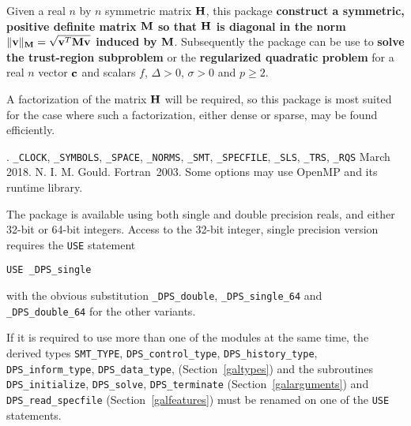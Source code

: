 \documentclass{galahad}
\newcommand{\packagename}{DPS}
\newcommand{\fullpackagename}{\libraryname\_\packagename}
\begin{document}
\galheader


\galsummary
Given a real $n$ by $n$ symmetric matrix ${\mathbf{H}}$, this package {\bf construct a
symmetric, positive definite matrix ${\mathbf{M}}$ so that ${\mathbf{H}}$
is diagonal in the norm $\|{\mathbf{v}}\|_{{\mathbf{M}}} = \sqrt{{\mathbf{v}}^T {\mathbf{M}} {\mathbf{v}}}$
induced by ${\mathbf{M}}$}. Subsequently the package can be use to
{\bf solve the trust-region subproblem}
or the {\bf regularized quadratic problem}
for a real $n$ vector ${\mathbf{c}}$ and scalars $f$, $\Delta>0$, $\sigma>0$
and $p \geq 2$.

\noindent
A factorization of the matrix ${\mathbf{H}}$ will be required, so this package is
most suited for the case where such a factorization, either dense or sparse,
may be found efficiently.


\galattributes
\galversions{\tt  \fullpackagename\_single, \fullpackagename\_double}.
\galuses
{\tt \libraryname\_CLOCK},
{\tt \libraryname\_SY\-M\-BOLS},
{\tt \libraryname\_SPACE}, {\tt \libraryname\_\-NORMS},
{\tt \libraryname\_\-SMT},
{\tt \libraryname\_\-SPECFILE},
{\tt \libraryname\_SLS}, {\tt \libraryname\_TRS},
{\tt \libraryname\_RQS}
\galdate March 2018.
\galorigin N. I. M. Gould.
\gallanguage Fortran~2003.
\galparallelism Some options may use OpenMP and its runtime library.


\galhowto

The package is available using both single and double precision reals, 
and either 32-bit or 64-bit integers. Access to the 32-bit integer,
single precision version requires the {\tt USE} statement
\medskip

\hspace{8mm} {\tt USE \fullpackagename\_single}

\medskip
\noindent
with the obvious substitution {\tt \fullpackagename\_double},
{\tt \fullpackagename\_single\_64} and 
{\tt \fullpackagename\_double\_64} for the other variants.

\noindent
If it is required to use more than one of the modules at the same time, 
the derived types
{\tt SMT\_TYPE},
{\tt \packagename\_control\_type},
{\tt \packagename\_history\_\-type},
{\tt \packagename\_inform\_type},
{\tt \packagename\_data\_type},
(Section~\ref{galtypes})
and the subroutines
{\tt \packagename\_initialize},
{\tt \packagename\_solve}, {\tt \packagename\_\-terminate}
(Section~\ref{galarguments})
and
{\tt \packagename\_read\_specfile}
(Section~\ref{galfeatures})
must be renamed on one of the {\tt USE} statements.
\end{document}
